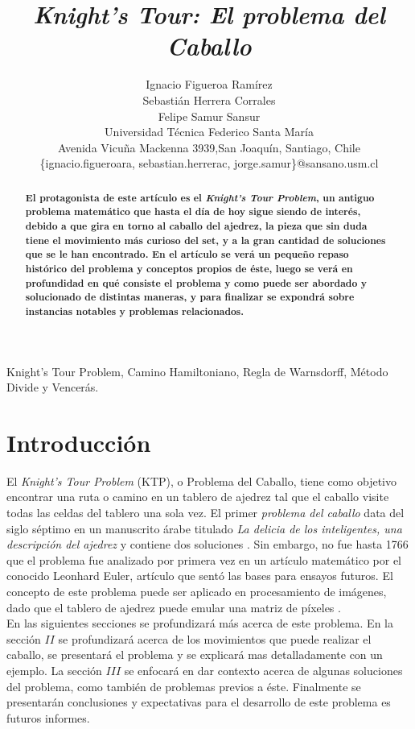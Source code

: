 \documentclass[journal, 10pt]{IEEEtran}
\begin{document}
\title{\textit{Knight's Tour:  El problema del Caballo}}
\author{Ignacio Figueroa Ram\'irez \\Sebasti\'an Herrera Corrales\\ Felipe Samur Sansur\\ Universidad T\'ecnica Federico Santa Mar\'ia \\ Avenida Vicu\~na Mackenna 3939,San Joaqu\'in, Santiago, Chile \\
\{ignacio.figueroara, sebastian.herrerac, jorge.samur\}@sansano.usm.cl}
\maketitle

\begin{abstract}
\textbf{El protagonista de este art\'iculo es el \textit{Knight's Tour Problem}, un antiguo problema matemático que hasta el día de hoy sigue siendo de interés, debido a que gira en torno al caballo del ajedrez, la pieza que sin duda tiene el movimiento más curioso del set, y a la gran cantidad de soluciones que se le han encontrado. En el artículo se verá un pequeño repaso histórico del problema y conceptos propios de éste, luego se verá en profundidad en qué consiste el problema y como puede ser abordado y solucionado de distintas maneras, y para finalizar se expondrá sobre instancias notables y problemas relacionados. }
\end{abstract}

\begin{IEEEkeywords}
Knight's Tour Problem, Camino Hamiltoniano, Regla de Warnsdorff, Método Divide y Vencerás.
\end{IEEEkeywords}

\section{Introducci\'on}
El \textit{Knight's Tour Problem} (KTP), o Problema del Caballo, tiene como objetivo encontrar una ruta o camino en un tablero de ajedrez tal que el caballo visite todas las celdas del tablero una sola vez.
El primer \textit{problema del caballo} data del siglo séptimo en un manuscrito árabe titulado \textit{La delicia de los inteligentes, una descripción del ajedrez} y contiene dos soluciones \cite{Murray:1913}. Sin embargo, no fue hasta 1766 que el problema fue analizado por primera vez en un artículo matem\'atico \cite{Euler:1759} por el conocido Leonhard Euler, art\'iculo que sentó las bases para ensayos futuros. El concepto de este problema puede ser aplicado en procesamiento de imágenes, dado que el tablero de ajedrez puede emular una matriz de píxeles \cite{Xiaoyong:2017}.\\
En las siguientes secciones se profundizará m\'as acerca de este problema. En la secci\'on $II$ se profundizar\'a acerca de los movimientos que puede realizar el caballo, se presentar\'a el problema y se explicar\'a mas detalladamente con un ejemplo. La secci\'on $III$ se enfocará en dar contexto acerca de algunas soluciones del problema, como también de problemas previos a éste. Finalmente se presentar\'an conclusiones y expectativas para el desarrollo de este problema es futuros informes.
\end{document}

